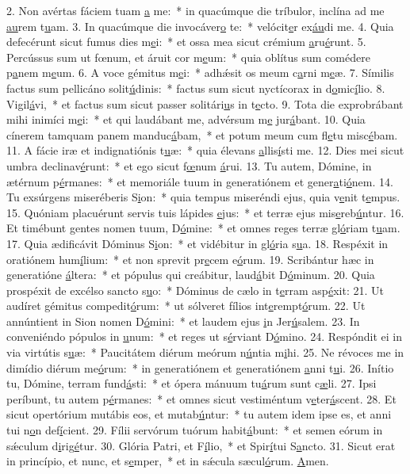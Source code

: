 2. Non avértas fáciem tuam \uline{a} me:~* in quacúmque die tríbulor, inclína ad me \uline{au}rem t\uline{u}am.
3. In quacúmque die invocáver\uline{o} te:~* velócit\uline{e}r ex\uline{áu}di me.
4. Quia defecérunt sicut fumus dies m\uline{e}i:~* et ossa mea sicut crémium \uline{a}ru\uline{é}runt.
5. Percússus sum ut fœnum, et áruit cor m\uline{e}um:~* quia oblítus sum comédere p\uline{a}nem m\uline{e}um.
6. A voce gémitus m\uline{e}i:~* adhǽsit os meum c\uline{a}rni m\uline{e}æ.
7. Símilis factus sum pellicáno solit\uline{ú}dinis:~* factus sum sicut nyctícorax in d\uline{o}mic\uline{í}lio.
8. Vigil\uline{á}vi,~* et factus sum sicut passer solitári\uline{u}s in t\uline{e}cto.
9. Tota die exprobrábant mihi inimíci m\uline{e}i:~* et qui laudábant me, advérsum m\uline{e} jur\uline{á}bant.
10. Quia cínerem tamquam panem manduc\uline{á}bam,~* et potum meum cum fl\uline{e}tu misc\uline{é}bam.
11. A fácie iræ et indignatiónis t\uline{u}æ:~* quia élevans \uline{a}llis\uline{í}sti me.
12. Dies mei sicut umbra declinav\uline{é}runt:~* et ego sicut f\uline{œ}num \uline{á}rui.
13. Tu autem, Dómine, in ætérnum p\uline{é}rmanes:~* et memoriále tuum in generatiónem et gener\uline{a}ti\uline{ó}nem.
14. Tu exsúrgens miseréberis S\uline{i}on:~* quia tempus miseréndi ejus, quia v\uline{e}nit t\uline{e}mpus.
15. Quóniam placuérunt servis tuis lápides \uline{e}jus:~* et terræ ejus mis\uline{e}reb\uline{ú}ntur.
16. Et timébunt gentes nomen tuum, D\uline{ó}mine:~* et omnes reges terræ gl\uline{ó}riam t\uline{u}am.
17. Quia ædificávit Dóminus S\uline{i}on:~* et vidébitur in gl\uline{ó}ria s\uline{u}a.
18. Respéxit in oratiónem hum\uline{í}lium:~* et non sprevit pr\uline{e}cem e\uline{ó}rum.
19. Scribántur hæc in generatióne \uline{á}ltera:~* et pópulus qui creábitur, laud\uline{á}bit D\uline{ó}minum.
20. Quia prospéxit de excélso sancto s\uline{u}o:~* Dóminus de cælo in t\uline{e}rram asp\uline{é}xit:
21. Ut audíret gémitus compedit\uline{ó}rum:~* ut sólveret fílios int\uline{e}rempt\uline{ó}rum.
22. Ut annúntient in Sion nomen D\uline{ó}mini:~* et laudem ejus \uline{i}n Jer\uline{ú}salem.
23. In conveniéndo pópulos in \uline{u}num:~* et reges ut s\uline{é}rviant D\uline{ó}mino.
24. Respóndit ei in via virtútis s\uline{u}æ:~* Paucitátem diérum meórum n\uline{ú}ntia m\uline{i}hi.
25. Ne révoces me in dimídio diérum me\uline{ó}rum:~* in generatiónem et generatiónem \uline{a}nni t\uline{u}i.
26. Inítio tu, Dómine, terram fund\uline{á}sti:~* et ópera mánuum tu\uline{á}rum sunt c\uline{æ}li.
27. Ipsi períbunt, tu autem p\uline{é}rmanes:~* et omnes sicut vestiméntum v\uline{e}ter\uline{á}scent.
28. Et sicut opertórium mutábis eos, et mutab\uline{ú}ntur:~* tu autem idem ipse es, et anni tui n\uline{o}n def\uline{í}cient.
29. Fílii servórum tuórum habit\uline{á}bunt:~* et semen eórum in sǽculum d\uline{i}rig\uline{é}tur.
30. Glória Patri, et F\uline{í}lio,~* et Spir\uline{í}tui S\uline{a}ncto.
31. Sicut erat in princípio, et nunc, et s\uline{e}mper,~* et in sǽcula sæcul\uline{ó}rum. \uline{A}men.
